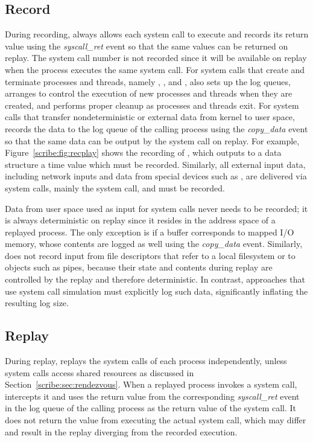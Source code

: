 \begin{table}[]
  

\subsection{Record}

During recording, \scribe{} always allows each system call to execute
and records its return value using the {\em syscall\_ret} event so
that the same values can be returned on replay.  The system call
number is not recorded since it will be available on replay when the
process executes the same system call.  
For system calls that create and terminate processes and threads,
namely , , and , \scribe{} also sets
up the log queues, arranges to control the execution of new processes
and threads when they are created, and performs proper cleanup as
processes and threads exit.
For system calls that transfer nondeterministic or external data from
kernel to user space, \scribe{} records the data to the log
queue of the calling process using the {\em copy\_data} event
so that the same data can be output by the system call on replay.
For example, Figure~\ref{scribe:fig:recplay} shows the recording of
, which outputs to a data structure a time value
which must be recorded. Similarly, all external input data, including
network inputs and data from special devices such
as , are delivered via system calls, mainly
the  system call, and must be recorded.

Data from user space used as input for system calls never
needs to be recorded; it is always deterministic on replay since it
resides in the address space of a replayed process. The only exception
is if a buffer corresponds to mapped I/O memory, whose
contents are logged as well using the {\em copy\_data}
event. Similarly, \scribe{} does not record input from file
descriptors that refer to a local filesystem or to objects such as
pipes, because their state and contents during replay are controlled
by the replay and therefore deterministic.  In contrast, approaches
that use system call simulation must explicitly log such data,
significantly inflating the resulting log size. 

\subsection{Replay}

During replay, \scribe{} replays the system calls of each process
independently, unless system calls access shared resources as discussed
in Section~\ref{scribe:sec:rendezvous}.  When a replayed process invokes a
system call, \scribe{} intercepts it and uses the return value from the
corresponding {\em syscall\_ret} event in the log queue of the calling
process as the return value of the system call.  It does not return
the value from executing the actual system call, which may differ and
result in the replay diverging from the recorded execution. 


\end{table}
